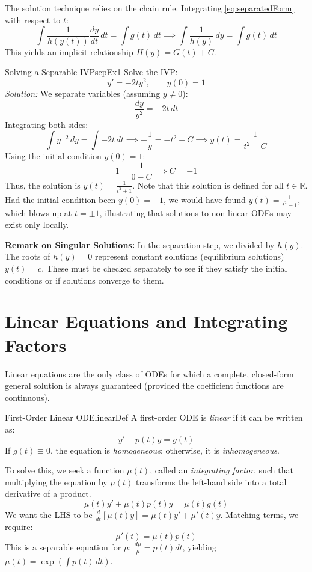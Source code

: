 \documentclass{book}
\newcommand{\R}{{\mathbb{R}}}
\begin{document}
The solution technique relies on the chain rule. Integrating \eqref{eq:separatedForm} with respect to $t$:
\[
    \int \frac{1}{h(y(t))} \frac{dy}{dt} \, dt = \int g(t) \, dt \implies \int \frac{1}{h(y)} \, dy = \int g(t) \, dt
\]
This yields an implicit relationship $H(y) = G(t) + C$.

\begin{example}{Solving a Separable IVP}{sepEx1}
    Solve the IVP:
    \[
        y' = -2ty^2, \qquad y(0) = 1
    \]
    \emph{Solution:}
    We separate variables (assuming $y \ne 0$):
    \[
        \frac{dy}{y^2} = -2t \, dt
    \]
    Integrating both sides:
    \[
        \int y^{-2} \, dy = \int -2t \, dt \implies -\frac{1}{y} = -t^2 + C \implies y(t) = \frac{1}{t^2 - C}
    \]
    Using the initial condition $y(0) = 1$:
    \[
        1 = \frac{1}{0 - C} \implies C = -1
    \]
    Thus, the solution is $y(t) = \frac{1}{t^2 + 1}$. Note that this solution is defined for all $t \in \R$. Had the initial condition been $y(0) = -1$, we would have found $y(t) = \frac{1}{t^2 - 1}$, which blows up at $t = \pm 1$, illustrating that solutions to non-linear ODEs may exist only locally.
\end{example}

\textbf{Remark on Singular Solutions:} In the separation step, we divided by $h(y)$. The roots of $h(y) = 0$ represent constant solutions (equilibrium solutions) $y(t) = c$. These must be checked separately to see if they satisfy the initial conditions or if solutions converge to them.

\section{Linear Equations and Integrating Factors}

Linear equations are the only class of ODEs for which a complete, closed-form general solution is always guaranteed (provided the coefficient functions are continuous).

\begin{defn}{First-Order Linear ODE}{linearDef}
    A first-order ODE is \emph{linear} if it can be written as:
    \[
        y' + p(t)y = g(t)
    \]
    If $g(t) \equiv 0$, the equation is \emph{homogeneous}; otherwise, it is \emph{inhomogeneous}.
\end{defn}

To solve this, we seek a function $\mu(t)$, called an \emph{integrating factor}, such that multiplying the equation by $\mu(t)$ transforms the left-hand side into a total derivative of a product.
\[
    \mu(t)y' + \mu(t)p(t)y = \mu(t)g(t)
\]
We want the LHS to be $\frac{d}{dt}[\mu(t)y] = \mu(t)y' + \mu'(t)y$. Matching terms, we require:
\[
    \mu'(t) = \mu(t)p(t)
\]
This is a separable equation for $\mu$: $\frac{d\mu}{\mu} = p(t)dt$, yielding $\mu(t) = \exp\left( \int p(t) \, dt \right)$.
\end{document}

